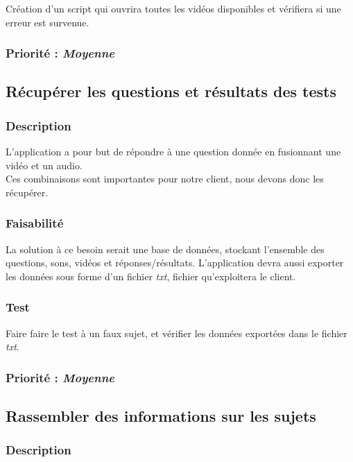 Création d’un script qui ouvrira toutes les vidéos disponibles et vérifiera si une erreur est survenue.

\subsubsection{Priorité : \textit{Moyenne}}


\subsection{Récupérer les questions et résultats des tests}

\subsubsection{Description}

L’application a pour but de répondre à une question donnée en fusionnant une vidéo et un audio.\\
Ces combinaisons sont importantes pour notre client, nous devons donc les récupérer.

\subsubsection{Faisabilité}

La solution à ce besoin serait une base de données, stockant l’ensemble des questions, sons, vidéos et réponses/résultats.
L’application devra aussi exporter les données sous forme d’un fichier \textit{txt}, fichier qu’exploitera le client.    

\subsubsection{Test}

Faire faire le test à un faux sujet, et vérifier les données exportées dans le fichier \textit{txt}.

\subsubsection{Priorité : \textit{Moyenne}}


\subsection{Rassembler des informations sur les sujets}

\subsubsection{Description}

